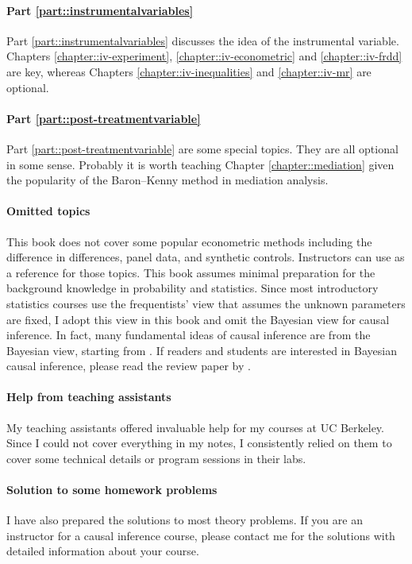 \paragraph*{Part \ref{part::instrumentalvariables}}
Part \ref{part::instrumentalvariables} discusses the idea of the instrumental variable.  Chapters \ref{chapter::iv-experiment}, \ref{chapter::iv-econometric} and \ref{chapter::iv-frdd} are key, whereas Chapters \ref{chapter::iv-inequalities} and \ref{chapter::iv-mr} are optional.


\paragraph*{Part \ref{part::post-treatmentvariable}}
Part \ref{part::post-treatmentvariable} are some special topics.  They are all optional in some sense. Probably it is worth teaching Chapter \ref{chapter::mediation} given the popularity of the Baron--Kenny method in mediation analysis. 


\paragraph*{Omitted topics}
This book does not cover some popular econometric methods including the difference in differences, panel data, and synthetic controls. Instructors can use \citet{angrist2008mostly} as a reference for those topics. 
This book assumes minimal preparation for the background knowledge in probability and statistics.  Since most introductory statistics courses use the frequentists' view that assumes the unknown parameters are fixed, I adopt this view in this book and omit the Bayesian view for causal inference. In fact, many fundamental ideas of causal inference are from the Bayesian view, starting from \citet{rubin1978bayesian}. If readers and students are interested in Bayesian causal inference, please read the review paper by \citet{li2023bayesian}. 



\paragraph*{Help from teaching assistants}
My teaching assistants offered invaluable help for my courses at UC Berkeley. Since I could not cover everything in my notes, I consistently relied on them to cover some technical details or  program sessions in their labs. 
 


\paragraph*{Solution to some homework problems}
I have also prepared the solutions to most theory problems. If you are an instructor for a causal inference course, please contact me for the solutions with detailed information about your course.  





